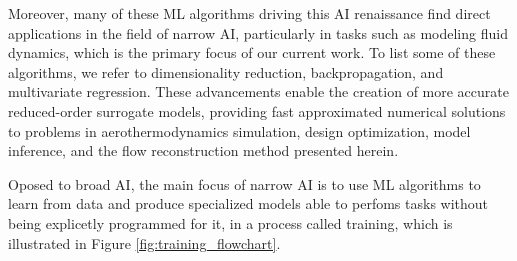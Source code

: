 Moreover, many of these ML algorithms driving this AI renaissance find direct applications in the field of narrow AI, particularly in tasks such as modeling fluid dynamics, which is the primary focus of our current work. To list some of these algorithms, we refer to dimensionality reduction, backpropagation, and multivariate regression. These advancements enable the creation of more accurate reduced-order surrogate models, providing fast approximated numerical solutions to problems in aerothermodynamics simulation, design optimization, model inference, and the flow reconstruction method presented herein.

Oposed to broad AI, the main focus of narrow AI is to use ML algorithms to learn from data and produce specialized models able to perfoms tasks without being explicetly programmed for it, in a process called training, which is illustrated in Figure \eqref{fig:training_flowchart}.

